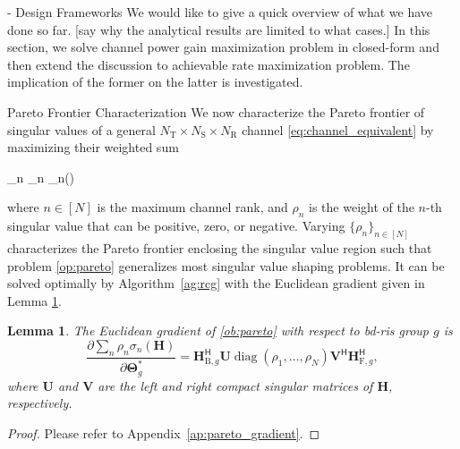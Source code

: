 \documentclass[journal]{IEEEtran}
\DeclareMathOperator{\diag}{diag}
\newtheorem{lemma}{Lemma}
\begin{document}
\begin{section}{- Design Frameworks}
	We would like to give a quick overview of what we have done so far.
	[say why the analytical results are limited to what cases.]
	In this section, we solve channel power gain maximization problem in closed-form and then extend the discussion to achievable rate maximization problem.
	The implication of the former on the latter is investigated.

	\begin{subsection}{Pareto Frontier Characterization}\label{sc:pareto_frontier}
		We now characterize the Pareto frontier of singular values of a general $N_\mathrm{T} \times N_\mathrm{S} \times N_\mathrm{R}$ channel \eqref{eq:channel_equivalent} by maximizing their weighted sum
		\begin{maxi!}
			{\scriptstyle{\mathbf{\Theta}}}{\sum_n \rho_n \sigma_n()}{\label{op:pareto}}{\label{ob:pareto}}
		\end{maxi!}
		where $n \in [N]$ is the maximum channel rank, and $\rho_n$ is the weight of the $n$-th singular value that can be positive, zero, or negative.
		Varying $\{\rho_n\}_{n \in [N]}$ characterizes the Pareto frontier enclosing the singular value region such that problem \eqref{op:pareto} generalizes most singular value shaping problems.
		It can be solved optimally by Algorithm~\ref{ag:rcg} with the Euclidean gradient given in Lemma \ref{lm:pareto_gradient}.

		\begin{lemma}\label{lm:pareto_gradient}
			The Euclidean gradient of \eqref{ob:pareto} with respect to \gls{bd}-\gls{ris} group $g$ is
			\begin{equation}
				\frac{\partial \sum_n \rho_n \sigma_n(\mathbf{H})}{\partial \mathbf{\Theta}_g^*} = \mathbf{H}_{\mathrm{B},g}^\mathsf{H} \mathbf{U} \diag(\rho_1,\ldots,\rho_N) \mathbf{V}^\mathsf{H} \mathbf{H}_{\mathrm{F},g}^\mathsf{H},
				\label{eq:pareto_gradient}
			\end{equation}
			where $\mathbf{U}$ and $\mathbf{V}$ are the left and right compact singular matrices of $\mathbf{H}$, respectively.
		\end{lemma}
		\begin{proof}
			Please refer to Appendix~\ref{ap:pareto_gradient}.
		\end{proof}


\end{subsection}
\end{section}
\end{document}
